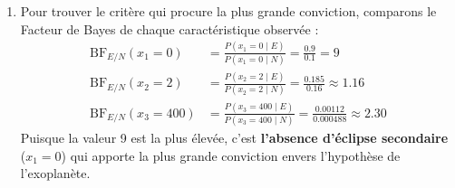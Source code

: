 \documentclass[solutions]{../exercices}
\begin{document}
\begin{solution}
\begin{enumerate}
		Calculons les scores log-vraisemblance totaux :
		\begin{align*}
			z_E &= \ln P(E) + \ln P(x_1 \mid E) + \ln P(x_2 \mid E) + \ln P(x_3 \mid E) \\
			&\approx -1.609 - 0.105 - 1.687 - 6.794 = -10.195 \\
			z_N &= \ln P(N) + \ln P(x_1 \mid N) + \ln P(x_2 \mid N) + \ln P(x_3 \mid N) \\
			&\approx -0.223 - 2.303 - 1.832 - 7.625 = -11.983
		\end{align*}

		Nous utilisons ensuite la fonction softmax pour les convertir en probabilités :
		\[
		P(E \mid x) = \frac{\exp(z_E)}{\exp(z_E) + \exp(z_N)} = \frac{\exp(-10.195)}{\exp(-10.195) + \exp(-11.983)} \approx 0.857
		\]
		Et par complément, $P(N \mid x) = 1 - P(E \mid x) \approx 0.143$.
		La probabilité que ce soit une exoplanète est d'environ \textbf{85.7\%}.

		\item Pour trouver le critère qui procure la plus grande conviction, comparons le Facteur de Bayes de chaque caractéristique observée :
		\begin{align*}
			\text{BF}_{E/N}(x_1=0) &= \frac{P(x_1=0 \mid E)}{P(x_1=0 \mid N)} = \frac{0.9}{0.1} = 9 \\
			\text{BF}_{E/N}(x_2=2) &= \frac{P(x_2=2 \mid E)}{P(x_2=2 \mid N)} = \frac{0.185}{0.16} \approx 1.16 \\
			\text{BF}_{E/N}(x_3=400) &= \frac{P(x_3=400 \mid E)}{P(x_3=400 \mid N)} = \frac{0.00112}{0.000488} \approx 2.30
		\end{align*}
		Puisque la valeur 9 est la plus élevée, c'est \textbf{l'absence d'éclipse secondaire} ($x_1=0$) qui apporte la plus grande conviction envers l'hypothèse de l'exoplanète.
	\end{enumerate}
\end{solution}
\end{document}
